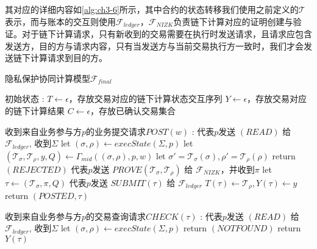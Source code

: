 其对应的详细内容如\autoref{alg:ch3-6}所示，其中合约的状态转移我们使用之前定义的$\mathcal{T}$表示，而与账本的交互则使用$\mathcal{F}_{ledger}$，$\mathcal{F}_{NIZK}$负责链下计算对应的证明创建与验证。对于链下计算请求，只有新收到的交易需要在执行时发送请求，且请求应包含发送方，目的方与请求内容，只有当发送方与当前交易执行方一致时，我们才会发送链下计算请求到目的方。
\begin{breakablealgorithm}
    \caption{隐私保护协同计算模型$\mathcal{F}_{final}$}
    \label{alg:ch3-6}
    \begin{algorithmic} 
        \item[初始状态]: 
        \STATE $T \leftarrow \epsilon$，存放交易对应的链下计算状态交互序列
        \STATE $Y \leftarrow \epsilon$，存放交易对应的链下计算结果
        \STATE $C \leftarrow \epsilon$，存放已确认交易集合
        \item[收到来自业务参与方$p$的业务提交请求$POST(w)$]:
        \STATE 代表$p$发送 $(READ)$ 给 $\mathcal{F}_{ledger}$, 收到$\Sigma$
        \STATE let $(\sigma, \rho) \leftarrow execState(\Sigma, p)$
        \STATE let $(\mathcal{T}_\sigma, \mathcal{T}_\rho, y, Q) \leftarrow \Gamma_{mid}((\sigma, \rho), p, w)$
        \STATE let $\sigma' = \mathcal{T}_\sigma(\sigma), \rho' = \mathcal{T}_\rho(\rho)$
        \STATE return $(REJECTED)$
        \ENDIF
        \STATE 代表$p$发送 $PROVE(\mathcal{T}_\sigma, \mathcal{T}_\rho)$ 给 $\mathcal{F}_{NIZK}$，并收到$\pi$
        \STATE let $\tau \leftarrow (\mathcal{T}_\sigma, \pi, Q)$
        \STATE 代表$p$发送 $SUBMIT(\tau)$ 给 $\mathcal{F}_{ledger}$
        \STATE $T(\tau) \leftarrow \mathcal{T}_\rho, Y(\tau) \leftarrow y$
        \STATE return $(POSTED, \tau)$

        \item[收到来自业务参与方$p$的交易查询请求$CHECK(\tau)$]:
        \STATE 代表$p$发送 $(READ)$ 给 $\mathcal{F}_{ledger}$, 收到$\Sigma$
        \STATE let $(\sigma, \rho) \leftarrow execState(\Sigma, p)$
        \IF {$\tau \notin \Sigma$}
        \STATE return $(NOTFOUND)$
        \ENDIF
        \STATE return $Y(\tau)$


\end{algorithmic}
\end{breakablealgorithm}
